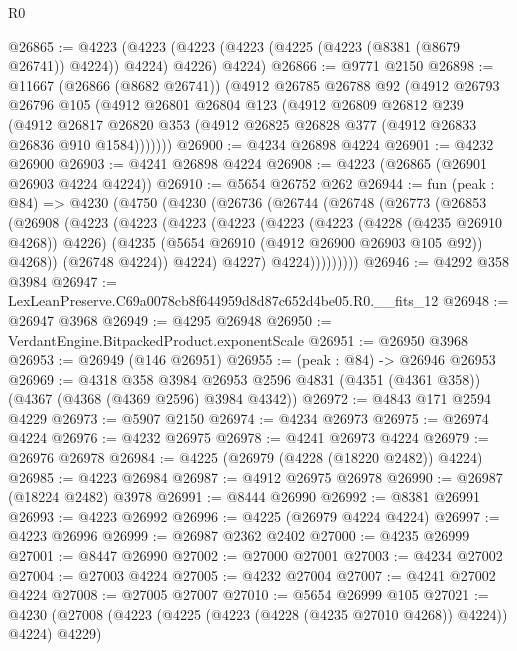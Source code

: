 \begin{lexlean}{R0}
\begin{coremodule}
@26865 := @4223
    (@4223 (@4223 (@4223 (@4225 (@4223 (@8381 (@8679 @26741)) @4224)) @4224) @4226) @4224)
@26866 := @9771 @2150
@26898 := @11667
    (@26866 (@8682 @26741))
    (@4912
      @26785
      @26788
      @92
      (@4912
        @26793
        @26796
        @105
        (@4912
          @26801
          @26804
          @123
          (@4912
            @26809
            @26812
            @239
            (@4912
              @26817
              @26820
              @353
              (@4912 @26825 @26828 @377 (@4912 @26833 @26836 @910 @1584)))))))
@26900 := @4234 @26898 @4224
@26901 := @4232 @26900
@26903 := @4241 @26898 @4224
@26908 := @4223 (@26865 (@26901 @26903 @4224 @4224))
@26910 := @5654 @26752 @262
@26944 := fun (peak : @84) =>
  @4230
    (@4750
      (@4230
        (@26736
          (@26744
            (@26748
              (@26773
                (@26853
                  (@26908
                    (@4223
                      (@4223
                        (@4223
                          (@4223
                            (@4223
                              (@4223 (@4228 (@4235 @26910 @4268)) @4226)
                              (@4235 (@5654 @26910 (@4912 @26900 @26903 @105 @92)) @4268))
                            (@26748 @4224))
                          @4224)
                        @4227)
                      @4224)))))))))
@26946 := @4292 @358 @3984
@26947 := LexLeanPreserve.C69a0078cb8f644959d8d87c652d4be05.R0.__fits_12
@26948 := @26947 @3968
@26949 := @4295 @26948
@26950 := VerdantEngine.BitpackedProduct.exponentScale
@26951 := @26950 @3968
@26953 := @26949 (@146 @26951)
@26955 := (peak : @84) -> @26946 @26953
@26969 := @4318
    @358
    @3984
    @26953
    @2596
    @4831
    (@4351 (@4361 @358))
    (@4367 (@4368 (@4369 @2596) @3984 @4342))
@26972 := @4843 @171 @2594 @4229
@26973 := @5907 @2150
@26974 := @4234 @26973
@26975 := @26974 @4224
@26976 := @4232 @26975
@26978 := @4241 @26973 @4224
@26979 := @26976 @26978
@26984 := @4225 (@26979 (@4228 (@18220 @2482)) @4224)
@26985 := @4223 @26984
@26987 := @4912 @26975 @26978
@26990 := @26987 (@18224 @2482) @3978
@26991 := @8444 @26990
@26992 := @8381 @26991
@26993 := @4223 @26992
@26996 := @4225 (@26979 @4224 @4224)
@26997 := @4223 @26996
@26999 := @26987 @2362 @2402
@27000 := @4235 @26999
@27001 := @8447 @26990
@27002 := @27000 @27001
@27003 := @4234 @27002
@27004 := @27003 @4224
@27005 := @4232 @27004
@27007 := @4241 @27002 @4224
@27008 := @27005 @27007
@27010 := @5654 @26999 @105
@27021 := @4230 (@27008 (@4223 (@4225 (@4223 (@4228 (@4235 @27010 @4268)) @4224)) @4224) @4229)

\end{coremodule}
\end{lexlean}
